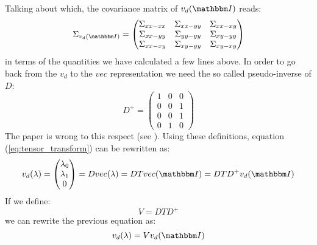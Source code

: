 \documentclass[a4paper,11pt]{article}
\newcommand{\itm}{\mathbbm I}
\begin{document}
Talking about which, the covariance matrix of $v_d(\itm)$ reads:
\begin{equation}
  \Sigma_{v_d(\itm)} = 
  \begin{pmatrix}
    \Sigma_{xx-xx} & \Sigma_{xx-yy} & \Sigma_{xx-xy}\\
    \Sigma_{xx-yy} & \Sigma_{yy-yy} & \Sigma_{xy-yy}\\
    \Sigma_{xx-xy} & \Sigma_{xy-yy} & \Sigma_{xy-xy}
  \end{pmatrix}
\end{equation}
in terms of the quantities we have calculated a few lines above.
In order to go back from the $v_d$ to the $vec$ representation we need
the so called pseudo-inverse of $D$:
\begin{equation}
  D^+ = 
  \begin{pmatrix}
    1 & 0 & 0\\
    0 & 0 & 1\\
    0 & 0 & 1\\
    0 & 1 & 0
  \end{pmatrix}
\end{equation}
The paper \cite{errors} is wrong to this respect (see \cite{errors_corr}).
Using these definitions, equation (\ref{eq:tensor_transform}) can be rewritten
as:
\begin{equation}
  v_d(\lambda) =
  \begin{pmatrix}
    \lambda_0\\
    \lambda_1\\
    0
  \end{pmatrix} =
  D vec(\lambda) = DT vec(\itm) = DTD^+ v_d(\itm)
\end{equation}
If we define:
\begin{equation}
  V = DTD^+
\end{equation}
we can rewrite the previous equation as:
\begin{equation}
  v_d(\lambda) = V v_d(\itm)
\end{equation}
\end{document}
